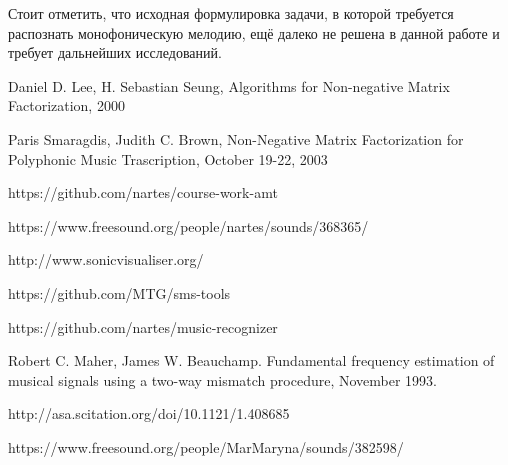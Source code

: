 \documentclass[oneside, final, 12pt]{extarticle}
\begin{document}
  Стоит отметить, что исходная формулировка задачи, в которой требуется
  распознать монофоническую мелодию, ещё далеко не решена в данной работе
  и требует дальнейших исследований.

\cleardoublepage

\begin{thebibliography}{0}






   Daniel D. Lee, H. Sebastian Seung,
  Algorithms for Non-negative Matrix Factorization, 2000

   Paris Smaragdis, Judith C. Brown,
    Non-Negative Matrix Factorization
    for Polyphonic Music Trascription, October 19-22, 2003







   https://github.com/nartes/course-work-amt

   https://www.freesound.org/people/nartes/sounds/368365/ 

   http://www.sonicvisualiser.org/

   https://github.com/MTG/sms-tools

   https://github.com/nartes/music-recognizer

   Robert C. Maher, James W. Beauchamp.
    Fundamental frequency estimation of musical signals
    using a two-way mismatch procedure, November 1993.

    http://asa.scitation.org/doi/10.1121/1.408685

    https://www.freesound.org/people/MarMaryna/sounds/382598/

\end{thebibliography}
\end{document}
